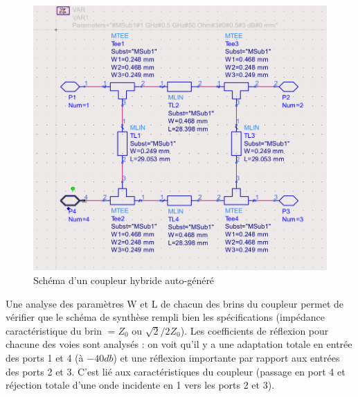 \documentclass[a4paper]{article}
\begin{document}
\begin{figure}[!htb]
\begin{center}
  \includegraphics[scale=0.30]{Coupleur-Hybride-Synthese.png}
  \caption{Sch\'ema d'un coupleur hybride auto-g\'en\'er\'e}
  \label{Coupleur-Hybride-Synthese}
\end{center}
\end{figure}

Une analyse des param\`etres W et L de chacun des brins du coupleur permet de v\'erifier que le sch\'ema
de synth\`ese rempli bien les sp\'ecifications (imp\'edance caract\'eristique du brin $= Z_0$ ou $ \sqrt{2}/2 Z_0$).
Les coefficients de r\'eflexion pour chacune des voies sont analys\'es : on voit qu'il y a une adaptation totale
en entr\'ee des ports 1 et 4 (\`a $-40 db$) et une r\'eflexion importante par rapport aux entr\'ees des ports 2 et 3.
C'est li\'e aux caract\'eristiques du coupleur (passage en port 4 et r\'ejection totale d'une onde incidente en 1 vers les
ports 2 et 3).
\end{document}

